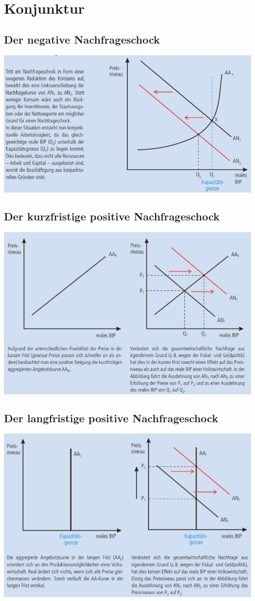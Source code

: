 \section{Konjunktur}
\subsection{Der negative Nachfrageschock}
\includegraphics[width=0.8\linewidth]{images/negnach.jpg}
\begin{multicols}{2}
\subsection{Der kurzfristige positive Nachfrageschock}
\includegraphics[width=0.98\linewidth]{images/posnachkurz.jpg}
\subsection{Der langfristige positive Nachfrageschock}
\includegraphics[width=0.98\linewidth]{images/posnachlang.jpg}
\end{multicols}
